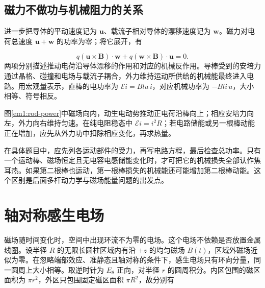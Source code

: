 \subsection{磁力不做功与机械阻力的关系}
进一步把导体的平动速度记为 $\bm u$、载流子相对导体的漂移速度记为 $\bm w$。磁力对电荷总速度 $\bm u+\bm w$ 的功率为零；将它展开，有

\[q(\bm u\times\bm B)\cdot\bm w
+q(\bm w\times\bm B)\cdot\bm u=0.\]
两项分别描述推动电荷沿导体漂移的作用和对应的机械反作用。导棒受到的安培力通过晶格、碰撞和电场与载流子耦合，外力维持运动所供给的机械能最终进入电路。用宏观量表示，直棒的电功率为 $\mathcal E i=Blu\,i$，对应机械功率为 $-Bli\,u$，大小相等、符号相反。


图\ref{em1:rod-power}中磁场向内，动生电动势推动正电荷沿棒向上；相应安培力向左，外力向右维持匀速。在纯电阻稳态中 $\mathcal E i=i^2R$；若电路储能或另一根棒动能正在增加，应先从外力功中扣除相应变化，再求热量。



在具体题目中，应先列各运动部件的受力，再写电路方程，最后检查总功率。只有一个运动棒、磁场恒定且无电容电感储能变化时，才可把它的机械损失全部认作焦耳热。如果第二根棒也运动，第一根棒损失的机械能还可能增加第二根棒动能。这个区别是后面多杆动力学与磁场能量问题的出发点。


\section{轴对称感生电场}

磁场随时间变化时，空间中出现环流不为零的电场。这个电场不依赖是否放置金属线圈。设半径 $R$ 的无限长圆柱区域内有沿 $+z$ 的均匀磁场 $B(t)$，区域外磁场近似为零。在忽略端部效应、准静态且轴对称的条件下，感生电场只有环向分量，同一圆周上大小相等。取逆时针为 $E_\theta$ 正向，对半径 $r$ 的圆周积分。内区包围的磁区面积为 $\pi r^2$，外区只包围固定磁区面积 $\pi R^2$，故分别有

